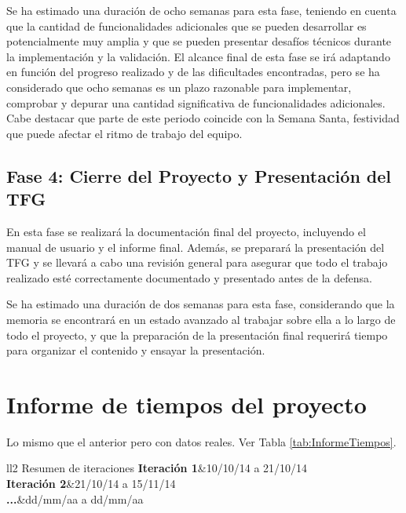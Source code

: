 Se ha estimado una duración de ocho semanas para esta fase, teniendo en cuenta que la cantidad de funcionalidades
adicionales que se pueden desarrollar es potencialmente muy amplia y que se pueden presentar desafíos técnicos
durante la implementación y la validación. El alcance final de esta fase se irá adaptando en función del progreso realizado y
de las dificultades encontradas, pero se ha considerado que ocho semanas es un plazo razonable para implementar, 
comprobar y depurar una cantidad significativa de funcionalidades adicionales. Cabe destacar que parte de este periodo
coincide con la Semana Santa, festividad que puede afectar el ritmo de trabajo del equipo.

\subsection{Fase 4: Cierre del Proyecto y Presentación del TFG}

En esta fase se realizará la documentación final del proyecto, incluyendo el manual de usuario y el 
informe final. Además, se preparará la presentación del TFG y se llevará a cabo una revisión 
general para asegurar que todo el trabajo realizado esté correctamente documentado y presentado 
antes de la defensa.

Se ha estimado una duración de dos semanas para esta fase, considerando que la memoria se encontrará en
un estado avanzado al trabajar sobre ella a lo largo de todo el proyecto, y que la preparación de 
la presentación final requerirá tiempo para organizar el contenido y ensayar la presentación.

\section{Informe de tiempos del proyecto}

Lo mismo que el anterior pero con datos reales. Ver Tabla \ref{tab:InformeTiempos}.

\begin{table}[htb]
	\centering
	\begin{coolTable}{ll}{2}
{Resumen de iteraciones}
	\textbf{Iteración 1}&10/10/14 a 21/10/14\\
	\textbf{Iteración 2}&21/10/14 a 15/11/14\\
	\textbf{...}&dd/mm/aa a dd/mm/aa\\
	\end{coolTable}
	\caption{Planificación temporal de iteraciones\label{tab:InformeTiempos}}
\end{table}

